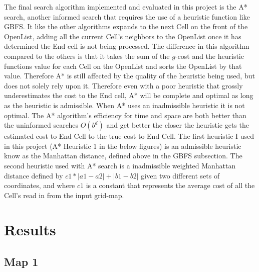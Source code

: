 \documentclass[conference]{IEEEtran}
\begin{document}
The final search algorithm implemented and evaluated in this project is the A* search, another informed search that requires the use of a heuristic function like GBFS. It like the other algorithms expands to the next Cell on the front of the OpenList, adding all the current Cell's neighbors to the OpenList once it has determined the End cell is not being processed. The difference in this algorithm compared to the others is that it takes the sum of the $g$-cost and the heuristic functions value for each Cell on the OpenList and sorts the OpenList by that value. Therefore A* is still affected by the quality of the heuristic being used, but does not solely rely upon it. Therefore even with a poor heuristic that grossly underestimates the cost to the End cell, A* will be complete and optimal as long as the heuristic is admissible. When A* uses an inadmissible heuristic it is not optimal. The A* algorithm's efficiency for time and space are both better than the uninformed searches $O(b^d)$ and get better the closer the heuristic gets the estimated cost to End Cell to the true cost to End Cell. The first heuristic I used in this project (A* Heuristic 1 in the below figures) is an admissible heuristic know as the Manhattan distance, defined above in the GBFS subsection. The second heuristic used with A* search is a inadmissible weighted Manhattan distance defined by $c1*|a1 - a2| + |b1 - b2|$ given two different sets of coordinates, and where $c1$ is a constant that represents the average cost of all the Cell's read in from the input grid-map.


\onecolumn
\section{Results}


\subsection{Map 1}
\end{document}
